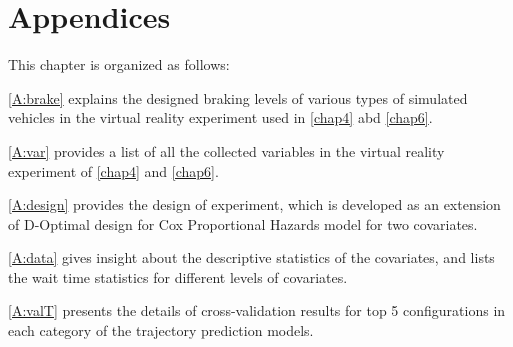 \chapter*{Appendices}
This chapter is organized as follows:

\cref{A:brake} explains the designed braking levels of various types of simulated vehicles in the virtual reality experiment used in \cref{chap4} abd \cref{chap6}.

\cref{A:var} provides a list of all the collected variables in the virtual reality experiment of \cref{chap4} and \cref{chap6}.

\cref{A:design} provides the design of experiment, which is developed as an extension of D-Optimal design for Cox Proportional Hazards model for two covariates.

\cref{A:data} gives insight about the descriptive statistics of the covariates, and lists the wait time statistics for different levels of covariates.

\cref{A:valT} presents the details of cross-validation results for top 5 configurations in each category of the trajectory prediction models.


\clearpage